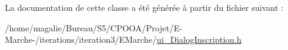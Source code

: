 La documentation de cette classe a été générée à partir du fichier suivant \-:\begin{DoxyCompactItemize}
\item 
/home/magalie/\-Bureau/\-S5/\-C\-P\-O\-O\-A/\-Projet/\-E-\/\-Marche-\//iterations/iteration3/\-E\-Marche/\hyperlink{ui___dialog_inscription_8h}{ui\-\_\-\-Dialog\-Inscription.\-h}\end{DoxyCompactItemize}
